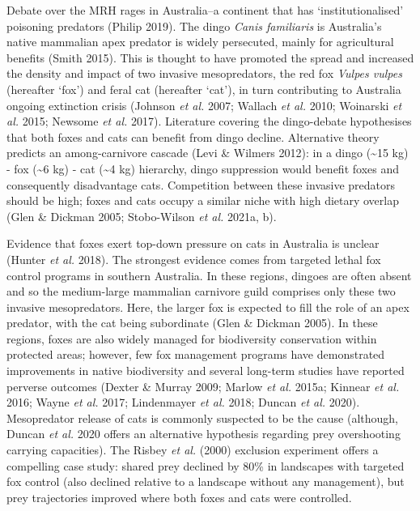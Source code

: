 \documentclass[11pt,a4paper,titlepage,twoside,openright]{style/unimelbthesis}
\begin{document}
\begin{mainmatter}
Debate over the MRH rages in Australia--a continent that has `institutionalised' poisoning predators (Philip 2019). The dingo \emph{Canis familiaris} is Australia's native mammalian apex predator is widely persecuted, mainly for agricultural benefits (Smith 2015). This is thought to have promoted the spread and increased the density and impact of two invasive mesopredators, the red fox \emph{Vulpes vulpes} (hereafter `fox') and feral cat (hereafter `cat'), in turn contributing to Australia ongoing extinction crisis (Johnson \emph{et al.} 2007; Wallach \emph{et al.} 2010; Woinarski \emph{et al.} 2015; Newsome \emph{et al.} 2017). Literature covering the dingo-debate hypothesises that both foxes and cats can benefit from dingo decline. Alternative theory predicts an among-carnivore cascade (Levi \& Wilmers 2012): in a dingo (\textasciitilde15 kg) - fox (\textasciitilde6 kg) - cat (\textasciitilde4 kg) hierarchy, dingo suppression would benefit foxes and consequently disadvantage cats. Competition between these invasive predators should be high; foxes and cats occupy a similar niche with high dietary overlap (Glen \& Dickman 2005; Stobo-Wilson \emph{et al.} 2021a, b).

Evidence that foxes exert top-down pressure on cats in Australia is unclear (Hunter \emph{et al.} 2018). The strongest evidence comes from targeted lethal fox control programs in southern Australia. In these regions, dingoes are often absent and so the medium-large mammalian carnivore guild comprises only these two invasive mesopredators. Here, the larger fox is expected to fill the role of an apex predator, with the cat being subordinate (Glen \& Dickman 2005). In these regions, foxes are also widely managed for biodiversity conservation within protected areas; however, few fox management programs have demonstrated improvements in native biodiversity and several long-term studies have reported perverse outcomes (Dexter \& Murray 2009; Marlow \emph{et al.} 2015a; Kinnear \emph{et al.} 2016; Wayne \emph{et al.} 2017; Lindenmayer \emph{et al.} 2018; Duncan \emph{et al.} 2020). Mesopredator release of cats is commonly suspected to be the cause (although, Duncan \emph{et al.} 2020 offers an alternative hypothesis regarding prey overshooting carrying capacities). The Risbey \emph{et al.} (2000) exclusion experiment offers a compelling case study: shared prey declined by 80\% in landscapes with targeted fox control (also declined relative to a landscape without any management), but prey trajectories improved where both foxes and cats were controlled.


\end{mainmatter}
\end{document}
